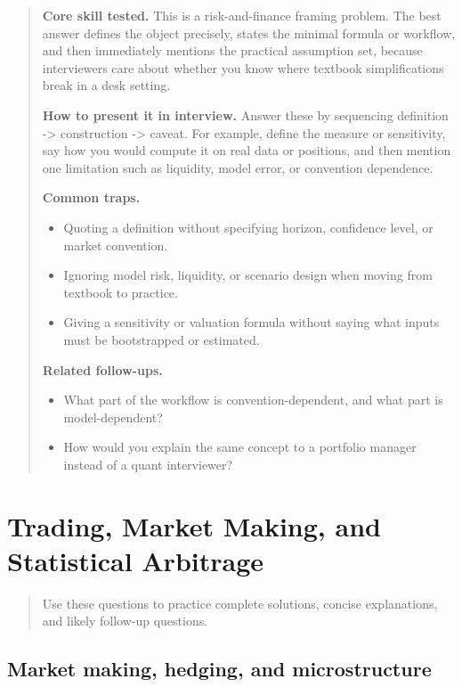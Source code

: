 \documentclass[11pt,letterpaper,openany]{book}
\newcommand{\ChapterIntro}[1]{%
  \begin{quote}\small #1\end{quote}%
}
\newenvironment{EditorialNote}
  {\begin{quote}\small\setlength{\parskip}{0.25em}}
  {\end{quote}}
\newcommand{\QuestionSpacer}{\vspace{0.4em}}
\begin{document}
\begin{EditorialNote}


\textbf{Core skill tested.} This is a risk-and-finance framing problem. The best answer defines the object precisely, states the minimal formula or workflow, and then immediately mentions the practical assumption set, because interviewers care about whether you know where textbook simplifications break in a desk setting.

\textbf{How to present it in interview.} Answer these by sequencing definition -> construction -> caveat. For example, define the measure or sensitivity, say how you would compute it on real data or positions, and then mention one limitation such as liquidity, model error, or convention dependence.

\textbf{Common traps.}
\begin{itemize}
\item Quoting a definition without specifying horizon, confidence level, or market convention.
\item Ignoring model risk, liquidity, or scenario design when moving from textbook to practice.
\item Giving a sensitivity or valuation formula without saying what inputs must be bootstrapped or estimated.
\end{itemize}

\textbf{Related follow-ups.}
\begin{itemize}
\item What part of the workflow is convention-dependent, and what part is model-dependent?
\item How would you explain the same concept to a portfolio manager instead of a quant interviewer?
\end{itemize}


\end{EditorialNote}
\QuestionSpacer

\section{Trading, Market Making, and Statistical Arbitrage}
\ChapterIntro{Use these questions to practice complete solutions, concise explanations, and likely follow-up questions.}

\subsection{Market making, hedging, and microstructure}
\end{document}

